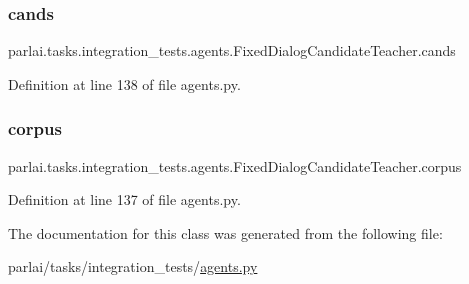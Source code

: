 \subsubsection{\texorpdfstring{cands}{cands}}
{\footnotesize\ttfamily parlai.\+tasks.\+integration\+\_\+tests.\+agents.\+Fixed\+Dialog\+Candidate\+Teacher.\+cands}



Definition at line 138 of file agents.\+py.

\mbox{\label{classparlai_1_1tasks_1_1integration__tests_1_1agents_1_1FixedDialogCandidateTeacher_aaa3a67fc9e86da10a8d3f8cc9baa8348}} 
\subsubsection{\texorpdfstring{corpus}{corpus}}
{\footnotesize\ttfamily parlai.\+tasks.\+integration\+\_\+tests.\+agents.\+Fixed\+Dialog\+Candidate\+Teacher.\+corpus}



Definition at line 137 of file agents.\+py.



The documentation for this class was generated from the following file\+:\begin{DoxyCompactItemize}
\item 
parlai/tasks/integration\+\_\+tests/\hyperlink{parlai_2tasks_2integration__tests_2agents_8py}{agents.\+py}\end{DoxyCompactItemize}
